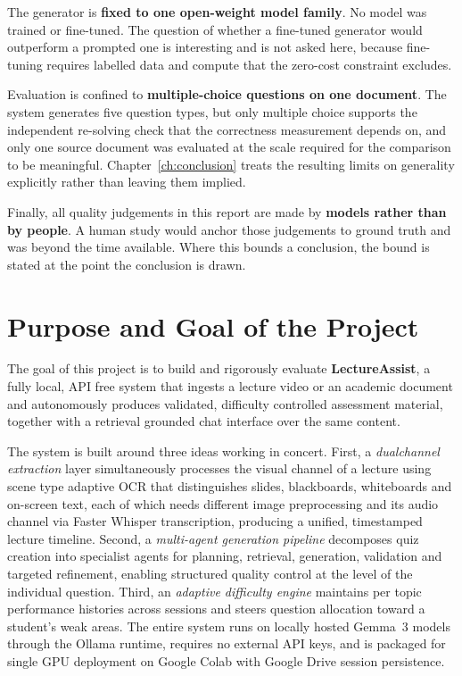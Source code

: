 The generator is \textbf{fixed to one open-weight model family}. No model was
trained or fine-tuned. The question of whether a fine-tuned generator would
outperform a prompted one is interesting and is not asked here, because
fine-tuning requires labelled data and compute that the zero-cost constraint
excludes.

Evaluation is confined to \textbf{multiple-choice questions on one document}.
The system generates five question types, but only multiple choice supports the
independent re-solving check that the correctness measurement depends on, and
only one source document was evaluated at the scale required for the comparison
to be meaningful. Chapter~\ref{ch:conclusion} treats the resulting limits on
generality explicitly rather than leaving them implied.

Finally, all quality judgements in this report are made by \textbf{models rather
than by people}. A human study would anchor those judgements to ground truth and
was beyond the time available. Where this bounds a conclusion, the bound is
stated at the point the conclusion is drawn.

\section{Purpose and Goal of the Project}
\label{sec:intro-purpose}

The goal of this project is to build and rigorously evaluate \textbf{LectureAssist},
a fully local, API free system that ingests a lecture video or an academic document
and autonomously produces validated, difficulty controlled assessment material,
together with a retrieval grounded chat interface over the same content.

The system is built around three ideas working in concert. First, a
\emph{dualchannel extraction} layer simultaneously processes the visual channel of
a lecture  using scene type adaptive OCR that distinguishes slides, blackboards,
whiteboards and on-screen text, each of which needs different image preprocessing
and its audio channel via Faster Whisper transcription, producing a unified,
timestamped lecture timeline. Second, a \emph{multi-agent generation pipeline}
decomposes quiz creation into specialist agents for planning, retrieval,
generation, validation and targeted refinement, enabling structured quality control
at the level of the individual question. Third, an \emph{adaptive difficulty engine}
maintains per topic performance histories across sessions and steers question
allocation toward a student's weak areas. The entire system runs on locally hosted
Gemma~3 models through the Ollama runtime, requires no external API keys, and is
packaged for single GPU deployment on Google Colab with Google Drive session
persistence.

